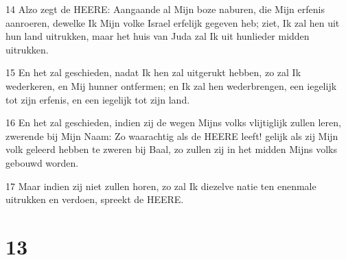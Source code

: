 \par 14 Alzo zegt de HEERE: Aangaande al Mijn boze naburen, die Mijn erfenis aanroeren, dewelke Ik Mijn volke Israel erfelijk gegeven heb; ziet, Ik zal hen uit hun land uitrukken, maar het huis van Juda zal Ik uit hunlieder midden uitrukken.
\par 15 En het zal geschieden, nadat Ik hen zal uitgerukt hebben, zo zal Ik wederkeren, en Mij hunner ontfermen; en Ik zal hen wederbrengen, een iegelijk tot zijn erfenis, en een iegelijk tot zijn land.
\par 16 En het zal geschieden, indien zij de wegen Mijns volks vlijtiglijk zullen leren, zwerende bij Mijn Naam: Zo waarachtig als de HEERE leeft! gelijk als zij Mijn volk geleerd hebben te zweren bij Baal, zo zullen zij in het midden Mijns volks gebouwd worden.
\par 17 Maar indien zij niet zullen horen, zo zal Ik diezelve natie ten enenmale uitrukken en verdoen, spreekt de HEERE.

\chapter{13}


